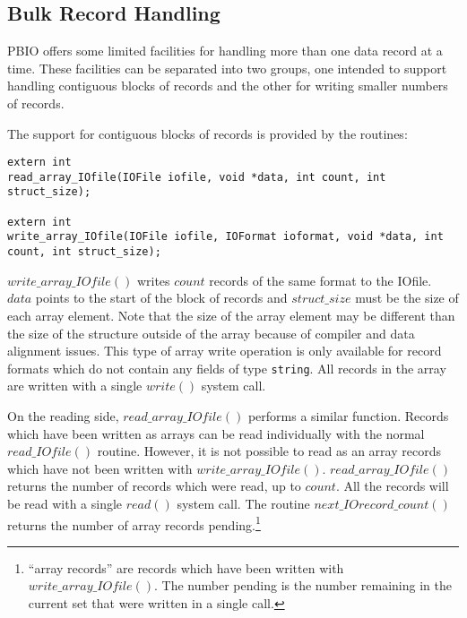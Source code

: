 \documentclass{article}
\begin{document}
\subsection{Bulk Record Handling}

PBIO offers some limited facilities for handling more than one data record at
a time.  These facilities can be separated into two groups, one intended to
support handling contiguous blocks of records and the other for writing smaller
numbers of records.

The support for contiguous blocks of records is provided by the routines:
\begin{verbatim}
extern int
read_array_IOfile(IOFile iofile, void *data, int count, int struct_size);

extern int
write_array_IOfile(IOFile iofile, IOFormat ioformat, void *data, int count, int struct_size);
\end{verbatim}
$write\_array\_IOfile()$ writes $count$ records of the same format to the
IOfile.  $data$ points to the start of the block of records and $struct\_size$
must be the size of each array element.  Note that the size of the array
element may be different than the size of the structure outside of the array
because of compiler and data alignment issues.  This type of array write
operation is only available for record formats which do not contain any fields
of type {\tt string}.  All records in the array are written with a single
$write()$ system call.

On the reading side, $read\_array\_IOfile()$ performs a similar function.
Records which have been written as arrays can be read individually with the
normal $read\_IOfile()$ routine.  However, it is not possible to read as an
array records which have not been written with $write\_array\_IOfile()$.
$read\_array\_IOfile()$ returns the number of records which were read, up to
$count$.  All the records will be read with a single $read()$ system call.
The routine $next\_IOrecord\_count()$ returns the number of array
records pending.\footnote{``array records'' are records which have been
written with $write\_array\_IOfile()$.  The number pending is the number
remaining in the current set that were written in a single call.}
\end{document}
